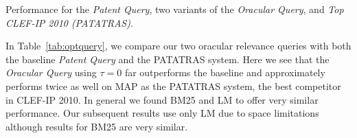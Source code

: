 %
%
%
%

\begin{table}[t!]
  \begin{center}
  \scriptsize
   \caption{Performance for the \textit{ Patent Query}, two variants of the \textit{ Oracular Query}, and \textit{ Top CLEF-IP 2010 (PATATRAS)}.}
   \vspace*{1ex}
     
  \label{tab:optquery}
  \end{center}  
\end{table}

In Table~\ref{tab:optquery}, we compare our two oracular relevance
queries with both the baseline \textit{Patent Query} and the PATATRAS system.  Here we see that
the \emph{Oracular Query} using $\tau=0$ far outperforms the baseline and
approximately performs twice as well on MAP as the PATATRAS system, the best competitor in
CLEF-IP 2010. 
In general we found BM25 and LM to offer very similar performance.  Our subsequent results use only LM due to space limitations although results for BM25 are very similar.
%
%

